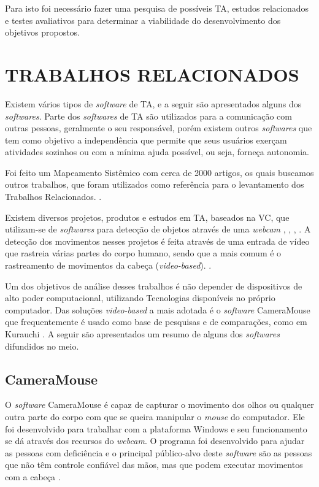 Para isto foi necessário fazer uma pesquisa de possíveis TA, estudos relacionados e testes avaliativos para determinar a viabilidade do desenvolvimento dos objetivos propostos.
    
\section{TRABALHOS RELACIONADOS}\label{Sub:trabalhos-relacionados}

Existem vários tipos de  \textit{software} de TA, e a seguir são apresentados alguns dos \textit{softwares}. Parte dos \textit{softwares} de TA são utilizados para a comunicação com outras pessoas, geralmente o seu responsável, porém existem outros \textit{softwares} que tem como objetivo a independência que permite que seus usuários exerçam atividades sozinhos ou com a mínima ajuda possível, ou seja, forneça autonomia.

Foi feito um Mapeamento Sistêmico com cerca de 2000 artigos, os quais buscamos outros trabalhos, que foram utilizados como referência para o levantamento dos Trabalhos Relacionados. \cite{da2018best-UPPERCASE}.

Existem diversos projetos, produtos e estudos em TA, baseados na VC, que utilizam-se de \textit{softwares} para detecção de objetos através de uma \textit{webcam} \cite{ramos2016letras} , \cite{gips2000camera}, \cite{bian2016facial}, \cite{marnik2014blinkmouse}. A detecção dos movimentos nesses projetos é feita através de uma entrada de vídeo que rastreia várias partes do corpo humano, sendo que a mais comum é o rastreamento de movimentos da cabeça (\textit{video-based}). \cite{al2013eye-UPPERCASE}. 

Um dos objetivos de análise desses trabalhos é não depender de dispositivos de alto poder computacional, utilizando Tecnologias disponíveis no próprio computador. Das soluções \textit{video-based} a mais adotada é o \textit{software} CameraMouse \cite{gips2000camera} que frequentemente é usado como base de pesquisas e de comparações, como em Kurauchi \cite{kurauchi2015hmagic}. A seguir são apresentados um resumo de alguns dos \textit{softwares} difundidos no meio.

\subsection{CameraMouse}
O \textit{software} CameraMouse é capaz de capturar o movimento dos olhos ou qualquer outra parte do corpo com que se queira manipular o \textit{mouse} do computador. Ele foi desenvolvido para trabalhar com a plataforma Windows e seu funcionamento se dá através dos recursos do \textit{webcam}. O programa foi desenvolvido para ajudar as pessoas com deficiência e o principal público-alvo deste \textit{software} são as pessoas que não têm controle confiável das mãos, mas que podem executar movimentos com a cabeça .


